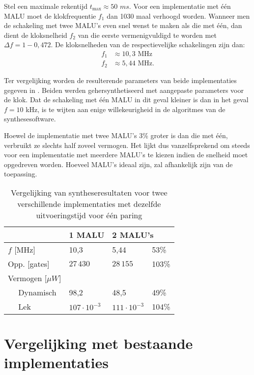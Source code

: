Stel een maximale rekentijd $t_{\text{max}} \approx 50$ $ms$. Voor een implementatie met \'e\'en MALU moet de klokfrequentie $f_1$ dan 1030 maal verhoogd worden. Wanneer men de schakeling met twee MALU's even snel wenst te maken als die met \'e\'en, dan dient de kloksnelheid $f_2$ van die eerste vermenigvuldigd te worden met $\Delta f = 1 - 0,472$. De kloksnelheden van de respectievelijke schakelingen zijn dan:
\[\begin{aligned}
f_1	&\approx 10,3\text{ MHz}\\
f_2	&\approx 5,44\text{ MHz}.
\end{aligned}\]

Ter vergelijking worden de resulterende parameters van beide implementaties gegeven in . Beiden werden gehersynthetiseerd met aangepaste parameters voor de klok. Dat de schakeling met \'e\'en MALU in dit geval kleiner is dan in het geval $f = 10$ kHz, is te wijten aan enige willekeurigheid in de algoritmes van de synthesesoftware.

Hoewel de implementatie met twee MALU's 3\% groter is dan die met \'e\'en, verbruikt ze slechts half zoveel vermogen. Het lijkt dus vanzelfsprekend om steeds voor een implementatie met meerdere MALU's te kiezen indien de snelheid moet opgedreven worden. Hoeveel MALU's ideaal zijn, zal afhankelijk zijn van de toepassing.

\begin{table}[h]
	\caption{Vergelijking van syntheseresultaten voor twee verschillende implementaties met dezelfde uitvoeringstijd voor \'e\'en paring}
	\label{tabel-resultaten-m1-vs-m2}

	\centering
	\begin{tabular}{lll@{$\;\;$}l}
		\toprule
		& 1 MALU	& \multicolumn{2}{l}{2 MALU's}\\
		\midrule
		$f$ [MHz]					& 10,3						& 5,44						& 53\% \\ 
		Opp. [gates]				& $27\,430$					& $28\,155$					& 103\% \\
		Vermogen [$\mu W$]		& 								& 								& \\
		$\quad$ Dynamisch			& 98,2						& 48,5						& 49\% \\
		$\quad$ Lek					& $107 \cdot 10^{-3}$	& $111 \cdot 10^{-3}$	& 104\% \\
		\bottomrule	
	\end{tabular}
\end{table}

\section{Vergelijking met bestaande implementaties}

